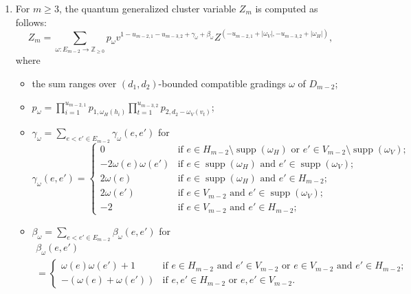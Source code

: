\documentclass[ALCO,ThmDefs,Unicode,epreuves]{cedram}
\newcommand{\ZZ}{\mathbb{Z}}
\DeclareMathOperator{\supp}{supp}
\begin{document}
\begin{corollary}\mbox{}
 \label{cor:quantum combinatorial}
 \begin{enumerate}
 \item\label{coro5.4_1} For $m\ge3$, the quantum generalized cluster variable $Z_m$ is computed as follows:
 \begin{equation}
 \label{eq:combinatorial quantum 1}
 Z_m=\sum\limits_{\omega:E_{m-2}\to\ZZ_{\ge0}}p_\omega v^{1-u_{m-2,1}-u_{m-3,2}+\gamma_\omega+\beta_\omega}Z^{(-u_{m-2,1}+|\omega_V|,-u_{m-3,2}+|\omega_H|)},
 \end{equation}
 where 
 \begin{itemize}
 \item the sum ranges over $(d_1,d_2)$-bounded compatible gradings $\omega$ of $D_{m-2}$;
 \item $p_\omega=\prod_{i=1}^{u_{m-2,1}}p_{1,\omega_H(h_i)}\prod_{t=1}^{u_{m-3,2}}p_{2,d_2-\omega_V(v_t)}$;
 \item $\gamma_\omega=\sum\limits_{e<e'\in E_{m-2}}\gamma_\omega(e,e')$ for
 \begin{equation}
 \label{eq:quantum weight 1}%
 \gamma_\omega(e,e')=\begin{cases}
 0 & \text{if $e\in H_{m-2}\setminus\supp(\omega_H)$ or $e'\in V_{m-2}\setminus\supp(\omega_V)$;}\\ 
 -2\omega(e)\omega(e') & \text{if $e\in\supp(\omega_H)$ and $e'\in\supp(\omega_V)$;}\\ 
 2\omega(e) & \text{if $e\in\supp(\omega_H)$ and $e'\in H_{m-2}$;}\\ 
 2\omega(e') & \text{if $e\in V_{m-2}$ and $e'\in\supp(\omega_V)$;}\\ 
 -2 & \text{if $e\in V_{m-2}$ and $e'\in H_{m-2}$;}
 \end{cases}
 \end{equation}
 \item $\beta_\omega=\sum\limits_{e<e'\in E_{m-2}}\beta_\omega(e,e')$ for
 \begin{multline}
 \label{eq:quantum weight 2}%
 \beta_\omega(e,e')\\
 =\begin{cases}
 \omega(e)\omega(e')+1 & \text{if $e\in H_{m-2}$ and $e'\in V_{m-2}$ or $e\in V_{m-2}$ and $e'\in H_{m-2}$;}\\ 
 -(\omega(e)+\omega(e')) & \text{if $e,e'\in H_{m-2}$ or $e,e'\in V_{m-2}$.} 
 \end{cases}
 \end{multline}

\end{itemize}
\end{enumerate}
\end{corollary}
\end{document}
